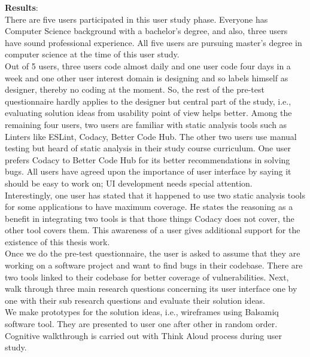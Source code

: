 \textbf{Results}: \\

There are five users participated in this user study phase. Everyone has Computer Science background with a bachelor’s degree, and also, three users have sound professional experience. All five users are pursuing master’s degree in computer science at the time of this user study. \\

Out of 5 users, three users code almost daily and one user code four days in a week and one other user interest domain is designing and so labels himself as designer, thereby no coding at the moment. So, the rest of the pre-test questionnaire hardly applies to the designer but central part of the study, i.e., evaluating solution ideas from usability point of view helps better. Among the remaining four users, two users are familiar with static analysis tools such as Linters like ESLint, Codacy, Better Code Hub. The other two users use manual testing but heard of static analysis in their study course curriculum. One user prefers Codacy to Better Code Hub for its better recommendations in solving bugs. All users have agreed upon the importance of user interface by saying it should be easy to work on;  UI development needs special attention.\\

Interestingly, one user has stated that it happened to use two static analysis tools for some applications to have maximum coverage. He states the reasoning as a benefit in integrating two tools is that those things Codacy does not cover, the other tool covers them. This awareness of a user gives additional support for the existence of this thesis work.
\\

Once we do the pre-test questionnaire, the user is asked to assume that they are working on a software project and want to find bugs in their codebase. There are two tools linked to their codebase for better coverage of vulnerabilities. Next, walk through three main research questions concerning its user interface one by one with their sub research questions and evaluate their solution ideas. \\

We make prototypes for the solution ideas, i.e., wireframes using Balsamiq software tool. They are presented to user one after other in random order. Cognitive walkthrough is carried out with Think Aloud process during user study. \\

